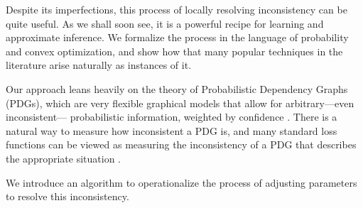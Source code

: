 \documentclass{article} %
\theoremstyle{plain}
\theoremstyle{definition}
\theoremstyle{remark}
\let\cite\citep
\newcommand\vfull[1]{}
\begin{document}
Despite its imperfections,
   this process of locally resolving inconsistency can be quite useful.
   As we shall soon see,
   it is a powerful recipe for learning and approximate inference.
%
We formalize the process
   in the language of probability and
   convex optimization,
   and show how that many popular techniques in the literature
   arise naturally as instances of it.



Our approach leans heavily on the theory of
Probabilistic Dependency Graphs (PDGs), which are very flexible graphical
   models that allow for arbitrary---even inconsistent---%
   probabilistic information, weighted by confidence \cite{pdg-aaai}.
There is a natural way
   to measure how inconsistent a PDG is,
   and many standard loss functions
   can be viewed as measuring the inconsistency of a PDG that
   describes the appropriate situation \cite{one-true-loss}.
\vfull{
   Recently, techniques have been developed to calculate this inconsistency
   in polynomial time for bounded tree-width,
   although it scales exponentially with the tree-width of the graph \cite{pdg-infer}.
   As we move to variables that are continuous variables of large dimension,
       it becomes intractable to calculate this global inconsistency
       even for small graphs---the log evidence
       of a latent variable model \cite{one-true-loss} can be
       represented as a PDG inconsistency, for example.
}
%
%
We introduce an algorithm
   to operationalize
   the process of adjusting parameters
   to resolve this inconsistency.
\end{document}
